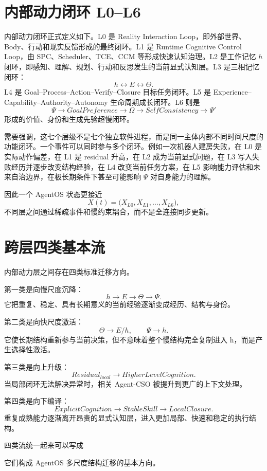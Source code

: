 \section{内部动力闭环 L0--L6}

内部动力闭环正式定义如下。L0 是 Reality Interaction Loop，即外部世界、Body、行动和现实反馈形成的最终闭环。L1 是 Runtime Cognitive Control Loop，由 SPC、Scheduler、TCE、CCM 等形成快速认知治理。L2 是工作记忆 $h$ 闭环，即感知、理解、规划、行动和反思发生的当前显式认知层。L3 是三相记忆闭环：
\[
h\leftrightarrow E\leftrightarrow\Theta.
\]
L4 是 Goal--Process--Action--Verify--Closure 目标任务闭环。L5 是 Experience--Capability--Authority--Autonomy 生命周期成长闭环。L6 则是
\[
\Psi
\rightarrow
GoalPreference
\rightarrow
\Omega
\rightarrow
SelfConsistency
\rightarrow
\Psi'
\]
形成的价值、身份和生成先验超慢闭环。

需要强调，这七个层级不是七个独立软件进程，而是同一主体内部不同时间尺度的功能闭环。一个事件可以同时参与多个闭环。例如一次机器人建房失败，在 L0 是实际动作偏差，在 L1 是 residual 升高，在 L2 成为当前显式问题，在 L3 写入失败经历并逐步改变结构经验，在 L4 改变当前任务方案，在 L5 影响能力评估和未来自治边界，在极长期条件下甚至可能影响 $\Psi$ 对自身能力的理解。

因此一个 AgentOS 状态更接近
\[
X(t)
=
\big(
X_{L0},
X_{L1},
\ldots,
X_{L6}
\big),
\]
不同层之间通过稀疏事件和慢约束耦合，而不是全连接同步更新。

\section{跨层四类基本流}

内部动力层之间存在四类标准迁移方向。

第一类是向慢尺度沉降：
\[
h\rightarrow E\rightarrow\Theta\rightarrow\Psi.
\]
它把重复、稳定、具有长期意义的当前经验逐渐变成经历、结构与身份。

第二类是向快尺度激活：
\[
\Theta\rightarrow E/h,
\qquad
\Psi\rightarrow h.
\]
它使长期结构重新参与当前决策，但不意味着整个慢结构完全复制进入 h，而是产生选择性激活。

第三类是向上升级：
\[
Residual_{local}
\rightarrow
HigherLevelCognition.
\]
当局部闭环无法解决异常时，相关 Agent-CSO 被提升到更广的上下文处理。

第四类是向下编译：
\[
ExplicitCognition
\rightarrow
StableSkill
\rightarrow
LocalClosure.
\]
重复成熟能力逐渐离开昂贵的显式认知层，进入更加局部、快速和稳定的执行结构。

四类流统一起来可以写成
\begin{statementbox}
\centering
{}
\end{statementbox}
它们构成 AgentOS 多尺度结构迁移的基本方向。

